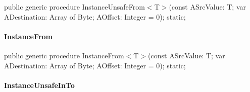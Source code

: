 \documentclass{report}
\newif\ifpdf
\begin{document}
\label{ok_generic.TBitConverter-InstanceUnsafeFrom}
\begin{list}{}{
\setlength{\itemindent}{0cm}
\setlength{\listparindent}{0cm}
\setlength{\leftmargin}{\evensidemargin}
\addtolength{\leftmargin}{\tmplength}
\settowidth{\labelsep}{X}
\addtolength{\leftmargin}{\labelsep}
\setlength{\labelwidth}{\tmplength}
}
\item[\textbf{Declaration}\hfill]
\ifpdf
\begin{flushleft}
\fi
\begin{ttfamily}
public generic procedure InstanceUnsafeFrom{$<$}T{$>$}(const ASrcValue: T; var ADestination: Array of Byte; AOffset: Integer = 0); static;\end{ttfamily}

\ifpdf
\end{flushleft}
\fi

\end{list}
\paragraph*{InstanceFrom}\hspace*{\fill}

\label{ok_generic.TBitConverter-InstanceFrom}
\begin{list}{}{
\setlength{\itemindent}{0cm}
\setlength{\listparindent}{0cm}
\setlength{\leftmargin}{\evensidemargin}
\addtolength{\leftmargin}{\tmplength}
\settowidth{\labelsep}{X}
\addtolength{\leftmargin}{\labelsep}
\setlength{\labelwidth}{\tmplength}
}
\item[\textbf{Declaration}\hfill]
\ifpdf
\begin{flushleft}
\fi
\begin{ttfamily}
public generic procedure InstanceFrom{$<$}T{$>$}(const ASrcValue: T; var ADestination: Array of Byte; AOffset: Integer = 0); static;\end{ttfamily}

\ifpdf
\end{flushleft}
\fi

\end{list}
\paragraph*{InstanceUnsafeInTo}\hspace*{\fill}
\end{document}
